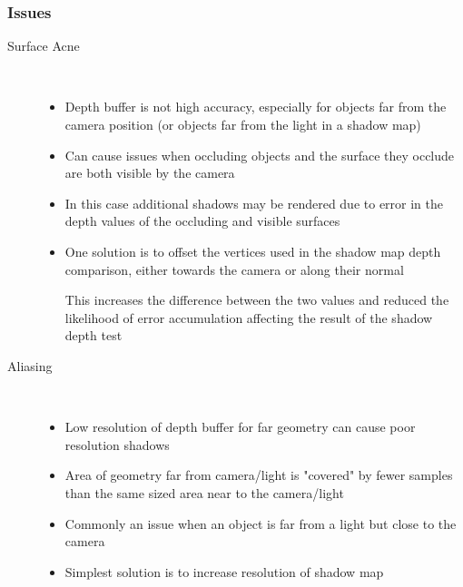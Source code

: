 \documentclass[a4paper]{article}
\begin{document}
\subsubsection{Issues}

\begin{description}
  \item[Surface Acne] \hfill \\

    \begin{itemize}
      \item
        Depth buffer is not high accuracy, especially for objects far from the
        camera position (or objects far from the light in a shadow map)

      \item
        Can cause issues when occluding objects and the surface they occlude are
        both visible by the camera

      \item
        In this case additional shadows may be rendered due to error in the
        depth values of the occluding and visible surfaces

      \item
        One solution is to offset the vertices used in the shadow map depth
        comparison, either towards the camera or along their normal

        This increases the difference between the two values and reduced the
        likelihood of error accumulation affecting the result of the shadow
        depth test

    \end{itemize}

  \item[Aliasing] \hfill \\

    \begin{itemize}
      \item
        Low resolution of depth buffer for far geometry can cause poor
        resolution shadows

      \item
        Area of geometry far from camera/light is "covered" by fewer samples
        than the same sized area near to the camera/light

      \item
        Commonly an issue when an object is far from a light but close to the
        camera

      \item
        Simplest solution is to increase resolution of shadow map

    \end{itemize}

\end{description}
\end{document}
